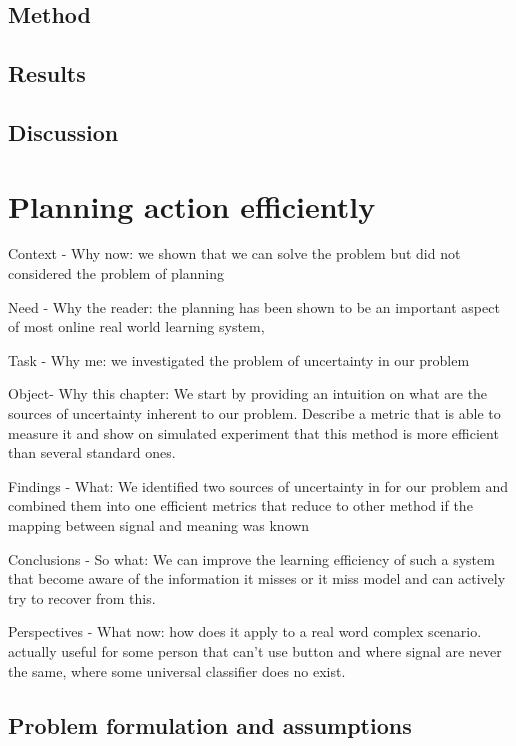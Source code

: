 \section{Method}

\section{Results}

\section{Discussion}

\chapter{Planning action efficiently}
\minitoc

Context - Why now: we shown that we can solve the problem but did not considered the problem of planning

Need - Why the reader: the planning has been shown to be an important aspect of most online real world learning system, 

Task - Why me: we investigated the problem of uncertainty in our problem

Object- Why this chapter: We start by providing an intuition on what are the sources of uncertainty inherent to our problem. Describe a metric that is able to measure it and show on simulated experiment that this method is more efficient than several standard ones.

Findings - What: We identified two sources of uncertainty in for our problem and combined them into one efficient metrics that reduce to other method if the mapping between signal and meaning was known

Conclusions - So what: We can improve the learning efficiency of such a system that become aware of the information it misses or it miss model and can actively try to recover from this.

Perspectives - What now: how does it apply to a real word complex scenario. actually useful for some person that can't use button and where signal are never the same, where some universal classifier does no exist.

\section{Problem formulation and assumptions}

